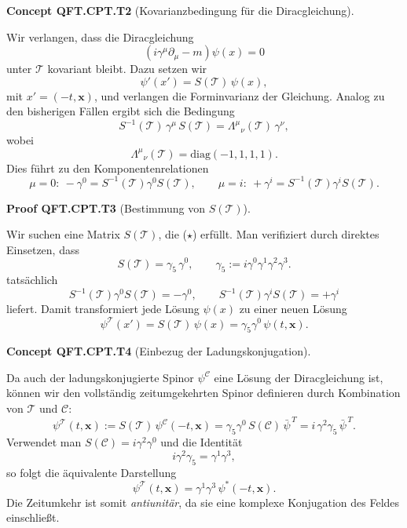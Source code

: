 \documentclass[10pt, letterpaper]{article}
\newcommand{\CustomHeading}[3]{%
  \par\medskip\noindent%
  \textbf{#1 #2} \textnormal{(#3)}.\enskip%
}
\newenvironment{CONC}[2]{\begin{unitbox}\CustomHeading{Concept}{#1}{#2}}{\end{unitbox}}
\newenvironment{PROOF}[2]{\begin{unitbox}\CustomHeading{Proof}{#1}{#2}}{\end{unitbox}}
\begin{document}
\begin{CONC}{QFT.CPT.T2}{Kovarianzbedingung für die Diracgleichung}
Wir verlangen, dass die Diracgleichung
\[
(i\gamma^\mu\partial_\mu - m)\psi(x)=0
\]
unter $\mathcal T$ kovariant bleibt.  
Dazu setzen wir
\[
\psi'(x') = S(\mathcal T)\,\psi(x),
\]
mit $x' = (-t,\mathbf x)$, und verlangen die Forminvarianz der Gleichung.  
Analog zu den bisherigen Fällen ergibt sich die Bedingung
\[
S^{-1}(\mathcal T)\,\gamma^\mu\,S(\mathcal T)
= \Lambda^\mu{}_\nu(\mathcal T)\,\gamma^\nu,
\]
wobei
\[
\Lambda^\mu{}_\nu(\mathcal T)
= \mathrm{diag}(-1,1,1,1).
\]
Dies führt zu den Komponentenrelationen
\[
\mu=0:\ -\gamma^0 = S^{-1}(\mathcal T)\gamma^0 S(\mathcal T),\qquad
\mu=i:\ +\gamma^i = S^{-1}(\mathcal T)\gamma^i S(\mathcal T).
\tag{$\star$}
\]

\end{CONC}

\begin{PROOF}{QFT.CPT.T3}{Bestimmung von $S(\mathcal T)$}
Wir suchen eine Matrix $S(\mathcal T)$, die ($\star$) erfüllt.  
Man verifiziert durch direktes Einsetzen, dass
\[
\boxed{\ S(\mathcal T) = \gamma_5\,\gamma^0,\qquad
\gamma_5 := i\gamma^0\gamma^1\gamma^2\gamma^3. \ }
\]
tatsächlich
\[
S^{-1}(\mathcal T)\gamma^0S(\mathcal T) = -\gamma^0,\qquad
S^{-1}(\mathcal T)\gamma^iS(\mathcal T) = +\gamma^i
\]
liefert.  
Damit transformiert jede Lösung $\psi(x)$ zu einer neuen Lösung
\[
\psi^{\mathcal T}(x') = S(\mathcal T)\,\psi(x)
= \gamma_5\gamma^0\,\psi(t,\mathbf x).
\]
\end{PROOF}

\begin{CONC}{QFT.CPT.T4}{Einbezug der Ladungskonjugation}
Da auch der ladungskonjugierte Spinor $\psi^{\mathcal C}$ eine Lösung der Diracgleichung ist, können wir den vollständig zeitumgekehrten Spinor definieren durch Kombination von $\mathcal T$ und $\mathcal C$:
\[
\psi^{\mathcal T}(t,\mathbf x)
:= S(\mathcal T)\,\psi^{\mathcal C}(-t,\mathbf x)
= \gamma_5\gamma^0\,S(\mathcal C)\,\bar\psi^{\,T}
= i\,\gamma^2\gamma_5\,\bar\psi^{\,T}.
\]
Verwendet man $S(\mathcal C)=i\gamma^2\gamma^0$ und die Identität
\[
i\gamma^2\gamma_5
= \gamma^1\gamma^3,
\]
so folgt die äquivalente Darstellung
\[
\boxed{\ \psi^{\mathcal T}(t,\mathbf x)
= \gamma^1\gamma^3\,\psi^*(-t,\mathbf x). \ }
\]
Die Zeitumkehr ist somit \emph{antiunitär}, da sie eine komplexe Konjugation des Feldes einschließt.
\end{CONC}
\end{document}
